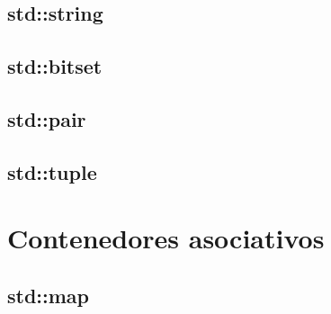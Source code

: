 \documentclass[12pt, fleqn]{report}                             %
\theoremstyle{break}                                            %
\begin{document}
               
        \section{std::string}

        \section{std::bitset}

        \clearpage
        \section{std::pair}

        \clearpage
        \section{std::tuple}


    \clearpage
    \chapter{Contenedores asociativos}
        
        \clearpage
        \section{std::map}
\end{document}
